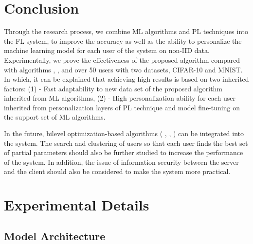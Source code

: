 \documentclass[runningheads]{llncs}
\begin{document}
\section{Conclusion}

Through the research process, we combine ML algorithms and PL techniques into the FL system, to improve the accuracy as well as the ability to personalize the machine learning model for each user of the system on non-IID data. Experimentally, we prove the effectiveness of the proposed algorithm  compared with algorithms , , and  over 50 users with two datasets, CIFAR-10 and MNIST. In which, it can be explained that achieving high results is based on two inherited factors: (1) - Fast adaptability to new data set of the proposed algorithm inherited from ML algorithms, (2) - High personalization ability for each user inherited from personalization layers of PL technique and model fine-tuning on the support set of ML algorithms.

In the future, bilevel optimization-based algorithms ( \cite{finn2017model},  \cite{rajeswaran2019meta}, ) can be integrated into the system. The search and clustering of users so that each user finds the best set of partial parameters should also be further studied to increase the performance of the system. In addition, the issue of information security between the server and the client should also be considered to make the system more practical.
\clearpage

%

\appendix
\section{Experimental Details}
\label{appendix}

\subsection{Model Architecture}
\label{model_architecture}
\end{document}
